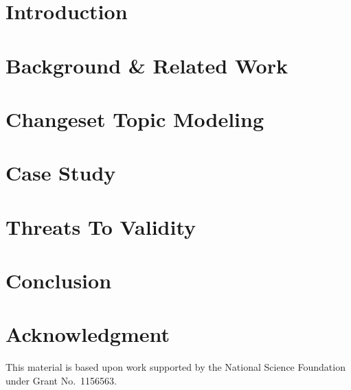 \documentclass[conference]{IEEEtran}
\begin{document}
\section{Introduction}
\label{sec:intro}


\section{Background \& Related Work}
\label{sec:related}


\section{Changeset Topic Modeling}
\label{sec:changeset}


\section{Case Study}
\label{sec:study}


\section{Threats To Validity}
\label{sec:threats}


\section{Conclusion}
\label{sec:conclusion}


\section*{Acknowledgment}
This material is based upon work supported
by the National Science Foundation under Grant No.\ 1156563. %

{


}
\end{document}
